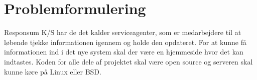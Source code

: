 \section{Problemformulering}
Responsum K/S har de det kalder serviceagenter, som er medarbejdere til at løbende tjekke informationen igennem og holde den opdateret. For at kunne få informationen ind i det nye system skal der være en hjemmeside hvor det kan indtastes. Koden for alle dele af projektet skal være open source og serveren skal kunne køre på Linux eller BSD.



